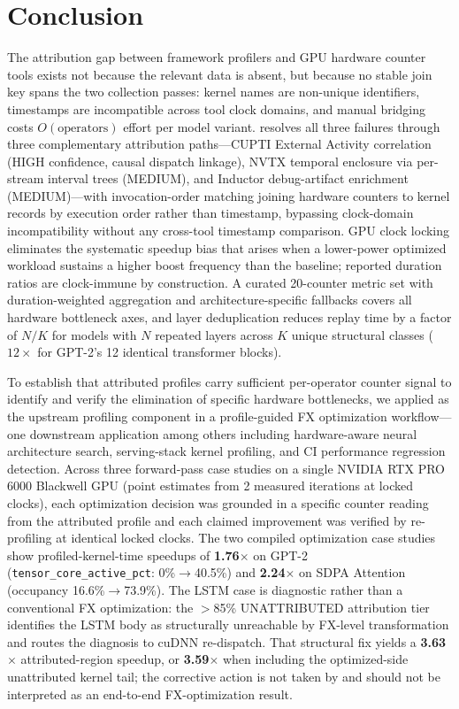 \section{Conclusion}
\label{sec:conclusion}

The attribution gap between framework profilers and GPU hardware counter tools exists not
because the relevant data is absent, but because no stable join key spans the two collection
passes: kernel names are non-unique identifiers, timestamps are incompatible across tool clock
domains, and manual bridging costs $O(\text{operators})$ effort per model variant.
\sys resolves all three failures through three complementary attribution paths---CUPTI
External Activity correlation (HIGH confidence, causal dispatch linkage), NVTX temporal
enclosure via per-stream interval trees (MEDIUM), and Inductor debug-artifact enrichment
(MEDIUM)---with invocation-order matching joining \ncu hardware counters to \nsys kernel
records by execution order rather than timestamp, bypassing clock-domain incompatibility
without any cross-tool timestamp comparison.
GPU clock locking eliminates the systematic speedup bias that arises when a lower-power
optimized workload sustains a higher boost frequency than the baseline; reported duration
ratios are clock-immune by construction.
A curated 20-counter metric set with duration-weighted aggregation and
architecture-specific fallbacks covers all hardware bottleneck axes, and layer deduplication
reduces \ncu replay time by a factor of $N/K$ for models with $N$ repeated layers across $K$
unique structural classes ($12{\times}$ for GPT-2's 12 identical transformer blocks).

To establish that attributed profiles carry sufficient per-operator counter signal to
identify and verify the elimination of specific hardware bottlenecks, we applied \sys as
the upstream profiling component in a profile-guided FX optimization workflow---one
downstream application among others including hardware-aware neural architecture search,
serving-stack kernel profiling, and CI performance regression detection.
Across three forward-pass case studies on a single NVIDIA RTX PRO 6000 Blackwell GPU
(point estimates from 2 measured iterations at locked clocks), each optimization decision
was grounded in a specific counter reading from the attributed profile and each claimed
improvement was verified by re-profiling at identical locked clocks.  The two compiled
optimization case studies show profiled-kernel-time speedups of
\textbf{1.76$\times$} on GPT-2 (\texttt{tensor\_core\_active\_pct}: 0\%$\to$40.5\%)
and \textbf{2.24$\times$} on SDPA Attention (occupancy 16.6\%$\to$73.9\%).
The LSTM case is diagnostic rather than a conventional FX optimization: the $>$85\%
UNATTRIBUTED attribution tier identifies the LSTM body as structurally unreachable by
FX-level transformation and routes the diagnosis to cuDNN re-dispatch.  That structural
fix yields a \textbf{3.63$\times$} attributed-region speedup, or \textbf{3.59$\times$}
when including the optimized-side unattributed kernel tail; the corrective action is
not taken by \sys and should not be interpreted as an end-to-end FX-optimization result.

